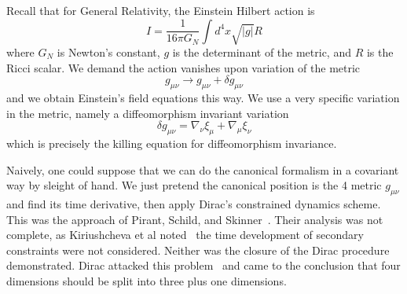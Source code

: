 Recall that for General Relativity, the Einstein Hilbert action
is
\begin{equation}%
I = \frac{1}{16\pi G_{N}}\int d^{4}x\sqrt{|g|}R
\end{equation}
where $G_N$ is Newton's constant, $g$ is the determinant of the
metric, and $R$ is the Ricci scalar. We demand the action
vanishes upon variation of the metric
\begin{equation}%
g_{\mu\nu}\to g_{\mu\nu}+\delta g_{\mu\nu}
\end{equation}
and we obtain Einstein's field equations this way. We use a very
specific variation in the metric, namely a diffeomorphism
invariant variation
\begin{equation}%
\delta g_{\mu\nu} = \nabla_{\nu}\xi_{\mu}+\nabla_{\mu}\xi_{\nu}
\end{equation}
which is precisely the killing equation for diffeomorphism
invariance.

Naively, one could suppose that we can do the canonical formalism
in a covariant way by sleight of hand. We just pretend the
canonical position is the 4 metric $g_{\mu\nu}$ and find its time
derivative, then apply Dirac's constrained dynamics scheme. This
was the approach of Pirant, Schild, and Skinner~\cite{Pirant:1952zz}. Their
analysis was not complete, as Kiriushcheva et al noted~\cite{Kiriushcheva:2008fn}
the time development of secondary constraints were not
considered. Neither was the closure of the Dirac procedure
demonstrated. Dirac attacked this problem~\cite{Dirac:1958sc} and
came to the conclusion that four dimensions should be split into
three plus one dimensions.

